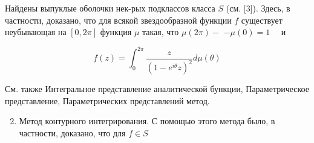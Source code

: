 \documentclass[10pt]{article}
\begin{document}
Найдены выпуклые оболочки нек-рых подклассов класса $S$ (см. [3]). Здесь, в частности, доказано, что для всякой звездообразной функции $f$ существует неубывающая на $[0,2 \pi]$ функция $\mu$ такая, что $\mu(2 \pi)-$ $-\mu(0)=1 \quad$ и



\[

f(z)=\int_{0}^{2 \pi} \frac{z}{\left(1-e^{i \theta} z\right)^{2}} d \mu(\theta)

\]



См. также Интегральное представление аналитической бункции, Параметрическое представление, Параметрических представлений метод.



\begin{enumerate}

  \setcounter{enumi}{1}

  \item Метод контурного интегрирования. С помощью этого метода было, в частности, доказано, что для $f \in S$

\end{enumerate}
\end{document}

